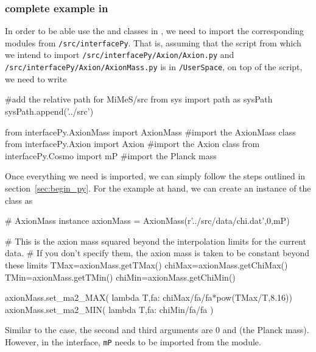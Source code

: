 \documentclass[11pt,a4paper]{article}
\begin{document}
\subsubsection{complete example in \PY}
%
In order to be able use the  and  classes in \PY, we need to import the corresponding modules from {\tt \mimes/src/interfacePy}. That is, assuming that the script from which we intend to import {\tt \mimes/src/interfacePy/Axion/Axion.py} and {\tt \mimes/src/interfacePy/Axion/AxionMass.py} is in {\tt \mimes/UserSpace}, on top of the script, we need to write
%
\begin{py}
	#add the relative path for MiMeS/src
	from sys import path as sysPath
	sysPath.append('../src')
	
	from interfacePy.AxionMass import AxionMass #import the AxionMass class
	from interfacePy.Axion import Axion #import the Axion class
	from interfacePy.Cosmo import mP #import the Planck mass
\end{py} 
%
Once everything we need is imported, we can simply follow the steps outlined in section~\ref{sec:begin_py}. For the example at hand, we can create an instance of the  class as
%
\begin{py}
	# AxionMass instance
	axionMass = AxionMass(r'../src/data/chi.dat',0,mP)
	
	# This is the axion mass squared beyond the interpolation limits for the current data. 
	# If you don't specify them, the axion mass is taken to be constant beyond these limits
	TMax=axionMass.getTMax() 
	chiMax=axionMass.getChiMax()
	TMin=axionMass.getTMin() 
	chiMin=axionMass.getChiMin()
	
	axionMass.set_ma2_MAX( lambda T,fa: chiMax/fa/fa*pow(TMax/T,8.16))
	axionMass.set_ma2_MIN( lambda T,fa: chiMin/fa/fa )
\end{py}
%
Similar to the \CPP case, the second and third arguments are $0$ and  (the Planck mass). However, in the \PY interface, {\tt mP} needs to be imported from the  module.
\end{document}
